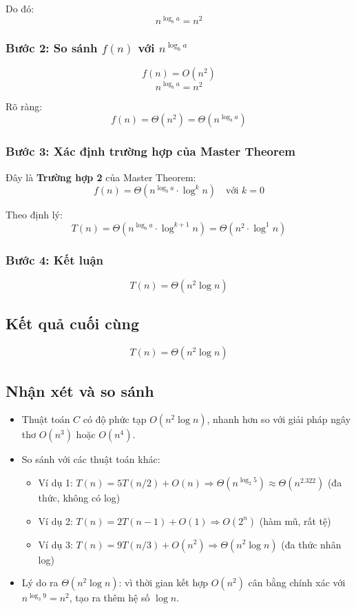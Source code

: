 \documentclass{article}
\begin{document}
Do đó:
\[
n^{\log_b a} = n^2
\]

\subsubsection{Bước 2: So sánh \(f(n)\) với \(n^{\log_b a}\)}

\[
f(n) = O(n^2)
\]
\[
n^{\log_b a} = n^2
\]

Rõ ràng:
\[
f(n) = \Theta(n^2) = \Theta\left(n^{\log_b a}\right)
\]

\subsubsection{Bước 3: Xác định trường hợp của Master Theorem}

Đây là \textbf{Trường hợp 2} của Master Theorem:
\[
f(n) = \Theta\left(n^{\log_b a} \cdot \log^k n\right) \quad \text{với } k = 0
\]

Theo định lý:
\[
T(n) = \Theta\left(n^{\log_b a} \cdot \log^{k+1} n\right) = \Theta\left(n^2 \cdot \log^{1} n\right)
\]

\subsubsection{Bước 4: Kết luận}

\[
\boxed{T(n) = \Theta\left(n^2 \log n\right)}
\]

\subsection{Kết quả cuối cùng}

\[
T(n) = \Theta(n^2 \log n)
\]

\subsection{Nhận xét và so sánh}

\begin{itemize}
    \item Thuật toán \(C\) có độ phức tạp \textbf{\(O(n^2 \log n)\)}, nhanh hơn so với giải pháp ngây thơ \(O(n^3)\) hoặc \(O(n^4)\).
    \item So sánh với các thuật toán khác:
    \begin{itemize}
        \item Ví dụ 1: \(T(n) = 5T(n/2) + O(n) \Rightarrow \Theta(n^{\log_2 5}) \approx \Theta(n^{2.322})\) (đa thức, không có log)
        \item Ví dụ 2: \(T(n) = 2T(n-1) + O(1) \Rightarrow O(2^n)\) (hàm mũ, rất tệ)
        \item Ví dụ 3: \(T(n) = 9T(n/3) + O(n^2) \Rightarrow \Theta(n^2 \log n)\) (đa thức nhân log)
    \end{itemize}
    \item Lý do ra \(\Theta(n^2 \log n)\): vì thời gian kết hợp \(O(n^2)\) cân bằng chính xác với \(n^{\log_3 9} = n^2\), tạo ra thêm hệ số \(\log n\).
\end{itemize}
\end{document}
